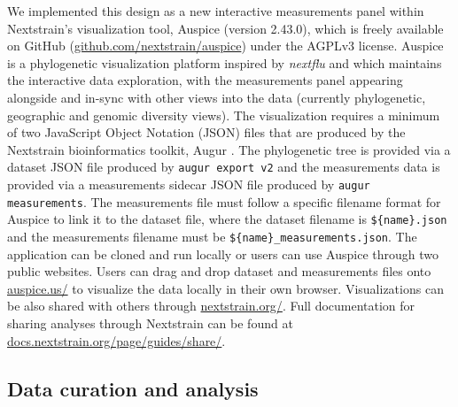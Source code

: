 \documentclass[utf8]{FrontiersinHarvard} %
\begin{document}
We implemented this design as a new interactive measurements panel within Nextstrain's visualization tool, Auspice (version 2.43.0), which is freely available on GitHub (\href{https://github.com/nextstrain/auspice}{github.com/nextstrain/auspice}) under the AGPLv3 license.
Auspice is a phylogenetic visualization platform inspired by \emph{nextflu} and which maintains the interactive data exploration, with the measurements panel appearing alongside and in-sync with other views into the data (currently phylogenetic, geographic and genomic diversity views).
The visualization requires a minimum of two JavaScript Object Notation (JSON) files that are produced by the Nextstrain bioinformatics toolkit, Augur \citep{Huddleston2021}.
The phylogenetic tree is provided via a dataset JSON file produced by \texttt{augur export v2} and the measurements data is provided via a measurements sidecar JSON file produced by \texttt{augur measurements}.
The measurements file must follow a specific filename format for Auspice to link it to the dataset file, where the dataset filename is \texttt{\$\{name\}.json} and the measurements filename must be \texttt{\$\{name\}\_measurements.json}.
The application can be cloned and run locally or users can use Auspice through two public websites.
Users can drag and drop dataset and measurements files onto \href{https://auspice.us/}{auspice.us/} to visualize the data locally in their own browser.
Visualizations can be also shared with others through \href{https://nextstrain.org/}{nextstrain.org/}.
Full documentation for sharing analyses through Nextstrain can be found at \href{https://docs.nextstrain.org/page/guides/share/}{docs.nextstrain.org/page/guides/share/}.

\subsection{Data curation and analysis}
\end{document}
